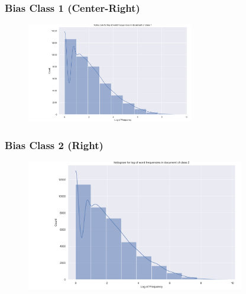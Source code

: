 \documentclass[11pt]{article}
\begin{document}
\subsubsection{Bias Class 1 (Center-Right)}
\begin{center}


\TTTFIDFTable
\begin{figure}[h!]
  \includegraphics[width=0.65\textwidth]{figs/words_histogram/hist_word_1.png}
\end{figure}
\end{center}

\pagebreak

\subsubsection{Bias Class 2 (Right)}
\begin{center}


\TTTFIDFTable
\begin{figure}[h!]
  \includegraphics[width=0.85\textwidth]{figs/words_histogram/hist_word_2.png}
\end{figure}
\end{center}
\end{document}
